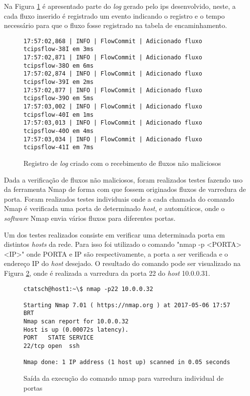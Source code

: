 Na Figura \ref{fig:lognormal} é apresentado parte do \textit{log} gerado pelo \gls{ips} desenvolvido, neste, a cada fluxo inserido é registrado um evento indicando o registro e o tempo necessário para que o fluxo fosse registrado na tabela de encaminhamento.
\FloatBarrier
\begin{figure}[H]
\centering
\caption{Registro de \textit{log} criado com o recebimento de fluxos não maliciosos}
\begin{lstlisting}[belowskip=-0.05\baselineskip]
17:57:02,868 | INFO | FlowCommit | Adicionado fluxo tcipsflow-38I em 3ms
17:57:02,871 | INFO | FlowCommit | Adicionado fluxo tcipsflow-38O em 6ms
17:57:02,874 | INFO | FlowCommit | Adicionado fluxo tcipsflow-39I em 2ms
17:57:02,877 | INFO | FlowCommit | Adicionado fluxo tcipsflow-39O em 5ms
17:57:03,002 | INFO | FlowCommit | Adicionado fluxo tcipsflow-40I em 1ms
17:57:03,013 | INFO | FlowCommit | Adicionado fluxo tcipsflow-40O em 4ms
17:57:03,034 | INFO | FlowCommit | Adicionado fluxo tcipsflow-41I em 7ms
\end{lstlisting}
\label{fig:lognormal}
\end{figure}

Dada a verificação de fluxos não maliciosos, foram realizados testes fazendo uso da ferramenta Nmap de forma com que fossem originados fluxos de varredura de porta.  Foram realizados testes individuais onde a cada chamada do comando Nmap é verificada uma porta de determinado \textit{host}, e automáticos, onde o \textit{software} Nmap envia vários fluxos para diferentes portas. 

Um dos testes realizados consiste em verificar uma determinada porta em distintos \textit{hosts} da rede. Para isso foi utilizado o comando "nmap -p <PORTA> <IP>" onde PORTA e IP são respectivamente, a porta a ser verificada e o endereço IP do \textit{host} desejado. O resultado do comando pode ser visualizado na Figura \ref{fig:outnmapp}, onde é realizada a varredura da porta 22 do \textit{host} 10.0.0.31.
\FloatBarrier
\begin{figure}[H]
\centering
\caption{Saída da execução do comando nmap para varredura individual de portas}
\begin{lstlisting}[belowskip=-0.05\baselineskip]
ctatsch@host1:~\$ nmap -p22 10.0.0.32

Starting Nmap 7.01 ( https://nmap.org ) at 2017-05-06 17:57 BRT
Nmap scan report for 10.0.0.32
Host is up (0.00072s latency).
PORT   STATE SERVICE
22/tcp open  ssh

Nmap done: 1 IP address (1 host up) scanned in 0.05 seconds

\end{lstlisting}
\label{fig:outnmapp}
\end{figure}

